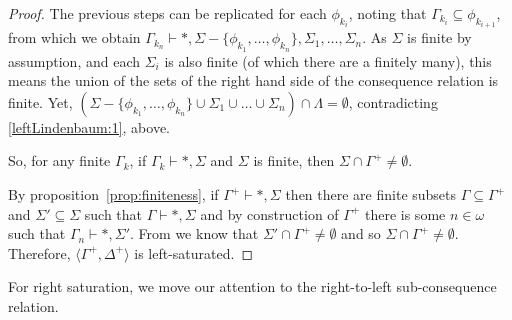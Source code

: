 \documentclass[10pt]{article}
\begin{document}
\begin{lemma}
\begin{proof}
    The previous steps can be replicated for each \(\phi_{k_{i}}\), noting that \(\Gamma_{k_{i}} \subseteq \phi_{k_{i+1}}\), from which we obtain \mbox{\(\Gamma_{k_{n}} \vdash \ast, \Sigma - \{\phi_{k_{1}},\dots,\phi_{k_{n}}\}, \Sigma_{1},\dots,\Sigma_{n}\)}.
    As \(\Sigma\) is finite by assumption, and each \(\Sigma_{i}\) is also finite (of which there are a finitely many), this means the union of the sets of the right hand side of the consequence relation is finite.
    Yet, \((\Sigma - \{\phi_{k_{1}},\dots,\phi_{k_{n}}\} \cup \Sigma_{1} \cup \dots \cup \Sigma_{n}) \cap \Lambda = \emptyset\), contradicting \ref{leftLindenbaum:1}, above.

    So, for any finite \(\Gamma_{k}\), if \(\Gamma_{k} \vdash \ast, \Sigma\) and \(\Sigma\) is finite, then \(\Sigma \cap \Gamma^{+} \ne \emptyset\).

    By proposition~\ref{prop:finiteness}, if \(\Gamma^{+} \vdash \ast, \Sigma\) then there are finite subsets \(\Gamma \subseteq \Gamma^{+}\) and \(\Sigma' \subseteq \Sigma\) such that \(\Gamma \vdash \ast, \Sigma\) and by construction of \(\Gamma^{+}\) there is some \(n \in \omega\) such that \(\Gamma_{n} \vdash \ast, \Sigma'\).
    From \label{leftLindenbaum:2} we know that \(\Sigma' \cap \Gamma^{+} \ne \emptyset\) and so \(\Sigma \cap \Gamma^{+} \ne \emptyset\).
    Therefore, \(\langle \Gamma^{+},\Delta^{+} \rangle\) is left-saturated.
  \end{proof}

\end{lemma}

For right saturation, we move our attention to the right-to-left sub-consequence relation.
\end{document}
